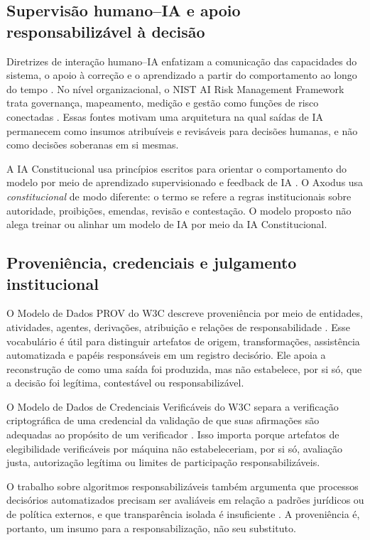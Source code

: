 \documentclass[11pt]{article}
\begin{document}
\subsection{Supervisão humano--IA e apoio responsabilizável à decisão}

Diretrizes de interação humano--IA enfatizam a comunicação das capacidades do
sistema, o apoio à correção e o aprendizado a partir do comportamento ao longo
do tempo \citep{amershi2019guidelines}. No nível organizacional, o NIST AI Risk
Management Framework trata governança, mapeamento, medição e gestão como
funções de risco conectadas \citep{tabassi2023airmf}. Essas fontes motivam uma
arquitetura na qual saídas de IA permanecem como insumos atribuíveis e
revisáveis para decisões humanas, e não como decisões soberanas em si mesmas.

A IA Constitucional usa princípios escritos para orientar o comportamento do
modelo por meio de aprendizado supervisionado e feedback de IA
\citep{bai2022constitutional}. O Axodus usa \emph{constitucional} de modo
diferente: o termo se refere a regras institucionais sobre autoridade,
proibições, emendas, revisão e contestação. O modelo proposto não alega treinar
ou alinhar um modelo de IA por meio da IA Constitucional.

\subsection{Proveniência, credenciais e julgamento institucional}

O Modelo de Dados PROV do W3C descreve proveniência por meio de entidades,
atividades, agentes, derivações, atribuição e relações de responsabilidade
\citep{w3c2013provdm}. Esse vocabulário é útil para distinguir artefatos de
origem, transformações, assistência automatizada e papéis responsáveis em um
registro decisório. Ele apoia a reconstrução de como uma saída foi produzida,
mas não estabelece, por si só, que a decisão foi legítima, contestável ou
responsabilizável.

O Modelo de Dados de Credenciais Verificáveis do W3C separa a verificação
criptográfica de uma credencial da validação de que suas afirmações são
adequadas ao propósito de um verificador \citep{w3c2025vcdm}. Isso importa
porque artefatos de elegibilidade verificáveis por máquina não estabeleceriam,
por si só, avaliação justa, autorização legítima ou limites de participação
responsabilizáveis.

O trabalho sobre algoritmos responsabilizáveis também argumenta que processos
decisórios automatizados precisam ser avaliáveis em relação a padrões
jurídicos ou de política externos, e que transparência isolada é insuficiente
\citep{kroll2017accountable}. A proveniência é, portanto, um insumo para a
responsabilização, não seu substituto.
\end{document}
